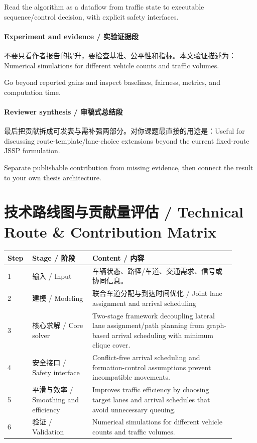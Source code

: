 \documentclass[UTF8,a4paper,11pt,fontset=fandol]{ctexart}
\begin{document}
Read the algorithm as a dataflow from traffic state to executable sequence/control decision, with explicit safety interfaces.

\paragraph{Experiment and evidence / 实验证据段}不要只看作者报告的提升，要检查基准、公平性和指标。本文验证描述为：Numerical simulations for different vehicle counts and traffic volumes.

Go beyond reported gains and inspect baselines, fairness, metrics, and computation time.

\paragraph{Reviewer synthesis / 审稿式总结段}最后把贡献拆成可发表与需补强两部分。对你课题最直接的用途是：Useful for discussing route-template/lane-choice extensions beyond the current fixed-route JSSP formulation.

Separate publishable contribution from missing evidence, then connect the result to your own thesis architecture.


\section{技术路线图与贡献量评估 / Technical Route \& Contribution Matrix}
\begin{longtable}{p{0.08\linewidth}p{0.24\linewidth}p{0.58\linewidth}}
\toprule
Step & Stage / 阶段 & Content / 内容\\
\midrule
1 & 输入 / Input & 车辆状态、路径/车道、交通需求、信号或协同信息。 \\
2 & 建模 / Modeling & 联合车道分配与到达时间优化 / Joint lane assignment and arrival scheduling \\
3 & 核心求解 / Core solver & Two-stage framework decoupling lateral lane assignment/path planning from graph-based arrival scheduling with minimum clique cover. \\
4 & 安全接口 / Safety interface & Conflict-free arrival scheduling and formation-control assumptions prevent incompatible movements. \\
5 & 平滑与效率 / Smoothing and efficiency & Improves traffic efficiency by choosing target lanes and arrival schedules that avoid unnecessary queuing. \\
6 & 验证 / Validation & Numerical simulations for different vehicle counts and traffic volumes. \\
\bottomrule
\end{longtable}
\end{document}
